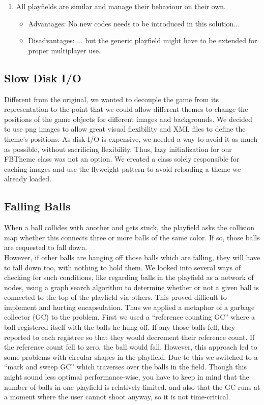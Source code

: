 \begin{description}
\begin{enumerate}
      \item All playfields are similar and manage their behaviour on their own.
      \begin{itemize}
        \item Advantages: No new codes needs to be introduced in this solution...
        \item Disadvantages: ... but the generic playfield might have to be extended for proper multiplayer use.
      \end{itemize}
    \end{enumerate}
%
\end{description}
%
\subsection{Slow Disk I/O}
%
Different from the original, we wanted to decouple the game from its representation 
to the point that we could allow different themes to change the positions of the 
game objects for different images and backgrounds. We decided to use png images to allow 
great visual flexibility and XML files to define the theme's positions. As disk I/O
is expensive, we needed a way to avoid it as much as possible, without sacrificing 
flexibility. Thus, lazy initialization for our FBTheme class was not an option. 
We created a class solely responsible for caching images and use the flyweight 
pattern to avoid reloading a theme we already loaded.
%
\subsection{Falling Balls}
When a ball collides with another and gets stuck, the playfield asks the 
collision map whether this connects three or more balls of the same color.
If so, those balls are requested to fall down.\\
However, if other balls are hanging off those balls which are falling, 
they will have to fall down too, with nothing to hold them. We looked 
into several ways of checking for such conditions, like regarding balls in the 
playfield as a network of nodes, using a graph search algorithm to determine 
whether or not a given ball is connected to the top of the playfield via 
others. This proved difficult to implement and hurting encapsulation. Thus 
we applied a metaphor of a garbage collector (GC) to the problem. First we used a
``reference counting GC'' where a ball registered itself with the balls he hung 
off. If any those balls fell, they reported to each registree so that they would 
decrement their reference count. If the reference count fell to zero, the ball 
would fall. However, this approach led to some problems with circular shapes 
in the playfield. Due to this we switched to a ``mark and sweep GC'' which traverses
over the balls in the field. Though this might sound less optimal performance-wise,
you have to keep in mind that the number of balls in one playfield is relatively limited, 
and also that the GC runs at a moment where the user cannot shoot anyway, so 
it is not time-critical.

